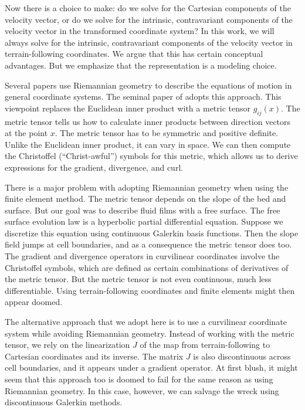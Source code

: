 \documentclass[gmd, manuscript]{copernicus}
\begin{document}
Now there is a choice to make: do we solve for the Cartesian components of the velocity vector, or do we solve for the intrinsic, contravariant components of the velocity vector in the transformed coordinate system?
In this work, we will always solve for the intrinsic, contravariant components of the velocity vector in terrain-following coordinates.
We argue that this has certain conceptual advantages.
But we emphasize that the representation is a modeling choice.

Several papers use Riemannian geometry to describe the equations of motion in general coordinate systems.
The seminal paper of \citet{gal1975use} adopts this approach.
This viewpoint replaces the Euclidean inner product with a metric tensor $g_{ij}(x)$.
The metric tensor tells us how to calculate inner products between direction vectors at the point $x$.
The metric tensor has to be symmetric and positive definite.
Unlike the Euclidean inner product, it can vary in space.
We can then compute the Christoffel (``Christ-awful'') symbols for this metric, which allows us to derive expressions for the gradient, divergence, and curl.

There is a major problem with adopting Riemannian geometry when using the finite element method.
The metric tensor depends on the slope of the bed and surface.
But our goal was to describe fluid films with a free surface.
The free surface evolution law is a hyperbolic partial differential equation.
Suppose we discretize this equation using continuous Galerkin basis functions.
Then the slope field jumps at cell boundaries, and as a consequence the metric tensor does too.
The gradient and divergence operators in curvilinear coordinates involve the Christoffel symbols, which are defined as certain combinations of derivatives of the metric tensor.
But the metric tensor is not even continuous, much less differentiable.
Using terrain-following coordinates and finite elements might then appear doomed.

The alternative approach that we adopt here is to use a curvilinear coordinate system while avoiding Riemannian geometry.
Instead of working with the metric tensor, we rely on the linearization $J$ of the map from terrain-following to Cartesian coordinates and its inverse.
The matrix $J$ is also discontinuous across cell boundaries, and it appears under a gradient operator.
At first blush, it might seem that this approach too is doomed to fail for the same reason as using Riemannian geometry.
In this case, however, we can salvage the wreck using discontinuous Galerkin methods.
\end{document}
